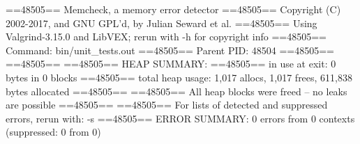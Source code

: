 ==48505== Memcheck, a memory error detector
==48505== Copyright (C) 2002-2017, and GNU GPL'd, by Julian Seward et al.
==48505== Using Valgrind-3.15.0 and LibVEX; rerun with -h for copyright info
==48505== Command: bin/unit_tests.out
==48505== Parent PID: 48504
==48505== 
==48505== 
==48505== HEAP SUMMARY:
==48505==     in use at exit: 0 bytes in 0 blocks
==48505==   total heap usage: 1,017 allocs, 1,017 frees, 611,838 bytes allocated
==48505== 
==48505== All heap blocks were freed -- no leaks are possible
==48505== 
==48505== For lists of detected and suppressed errors, rerun with: -s
==48505== ERROR SUMMARY: 0 errors from 0 contexts (suppressed: 0 from 0)

